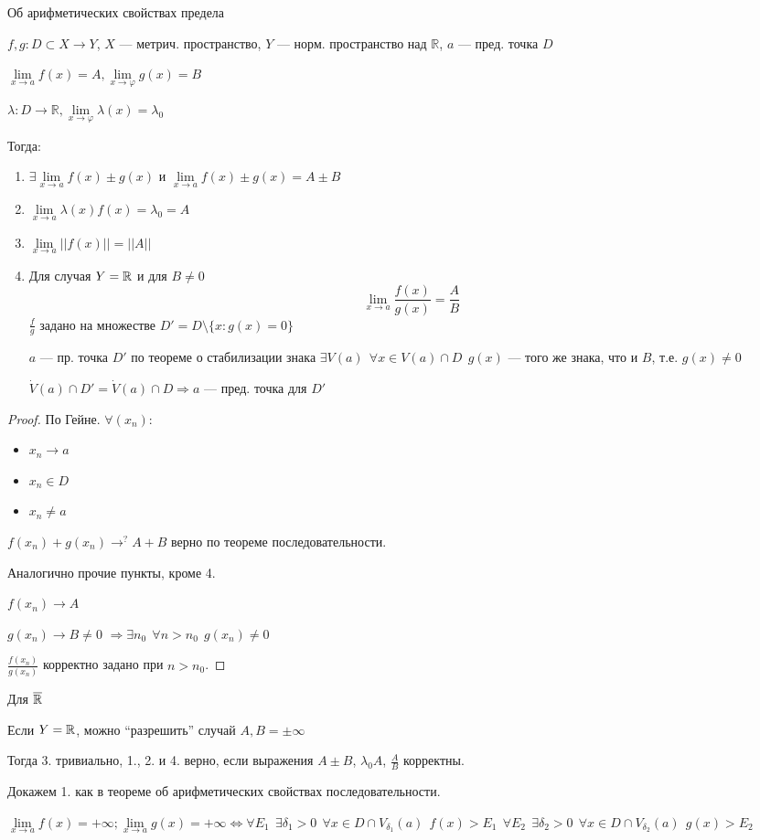 \begin{theorem}
    Об арифметических свойствах предела

    $f,g: D\subset X\to Y$, $X$ --- метрич. пространство, $Y$ --- норм. пространство над $\mathbb{R}$, $a$ --- пред. точка $D$

    $\lim\limits_{x\to a}f(x)=A, \lim\limits_{x\to \varphi}g(x)=B$
    
    $\lambda: D\to \mathbb{R}, \lim\limits_{x\to \varphi}\lambda (x) = \lambda_0$
    
    Тогда:
    \begin{enumerate}
        \item $\exists\lim\limits_{x\to a} f(x)\pm g(x)$ и $\lim\limits_{x\to a} f(x)\pm g(x)=A\pm B$
        \item $\lim\limits_{x\to a} \lambda(x) f(x) = \lambda_0=A$
        \item $\lim\limits_{x\to a} ||f(x)||=||A||$
        \item Для случая $Y=\operatorname*{\mathbb{R}}$ и для $B\not=0$ $$\lim\limits_{x\to a}\frac{f(x)}{g(x)}=\frac{A}{B}$$
        $\frac{f}{g}$ задано на множестве $D'=D\setminus \{x:g(x)=0\}$

        $a$ --- пр. точка $D'$ по теореме о стабилизации знака $\exists V(a) \ \ \forall x\in V(a)\cap D \ \ g(x)$ --- того же знака, что и $B$, т.е. $g(x)\not = 0$

        $\dot V(a)\cap D'=\dot V(a)\cap D \Rightarrow a$ --- пред. точка для $D'$
    \end{enumerate}
\end{theorem}
\begin{proof}
    По Гейне.
    $\forall (x_n):$
    \begin{itemize}
        \itemsep0em
        \item $x_n\to a$
        \item $x_n\in D$
        \item $x_n\not=a$
    \end{itemize}

    $f(x_n) + g(x_n)\to^? A+B$ верно по теореме последовательности.

    Аналогично прочие пункты, кроме 4.

    $f(x_n)\to A$

    $g(x_n)\to B\not=0$
    $\Rightarrow \exists n_0 \ \ \forall n>n_0 \ \ g(x_n)\not=0$

    $\frac{f(x_n)}{g(x_n)}$ корректно задано при $n>n_0$.
\end{proof}
\begin{remark}
    Для $\overline {\operatorname*{\mathbb{R}}}$

    Если $Y=\operatorname*{\mathbb{R}}$, можно ``разрешить'' случай $A, B=\pm \infty$

    Тогда 3. тривиально, 1., 2. и 4. верно, если выражения $A\pm B$, $\lambda_0 A$, $\frac{A}{B}$ корректны.

    Докажем 1. как в теореме об арифметических свойствах последовательности.

    $\lim\limits_{x\to a} f(x) = +\infty; \lim\limits_{x\to a} g(x) = +\infty \Leftrightarrow \forall E_1 \ \ \exists \delta_1>0 \ \ \forall x\in D\cap V_{\delta_1}(a) \ \ f(x) > E_1 \ \ \forall E_2 \ \ \exists \delta_2>0 \ \ \forall x\in D\cap V_{\delta_2}(a) \ \ g(x) > E_2$
\end{remark}
